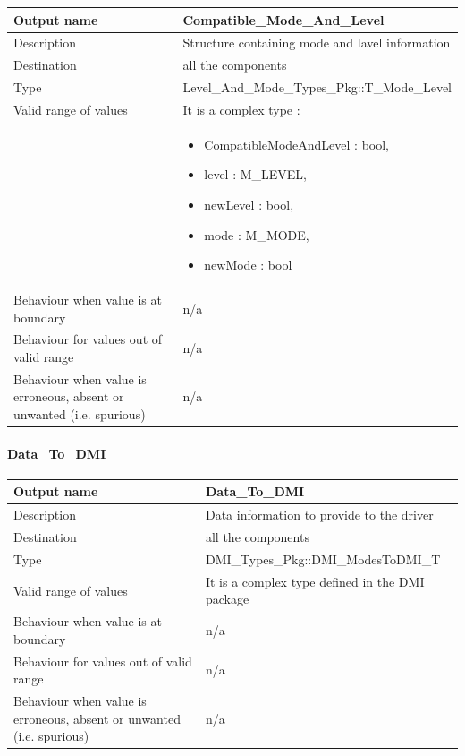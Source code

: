 \begin{longtable}{p{}p{}}
\toprule
Output name				& Compatible\_Mode\_And\_Level \\
\midrule
Description				& Structure containing mode and lavel information  \\
\midrule
Destination				& all the components  \\ 
\midrule
Type					& Level\_And\_Mode\_Types\_Pkg::T\_Mode\_Level \\
\midrule
Valid range of values	& It is a complex type : \\
& \begin{itemize}
\item CompatibleModeAndLevel : bool,
\item level : M\_LEVEL,
\item newLevel : bool,
\item mode : M\_MODE, 
\item newMode : bool
\end{itemize} \\
\midrule
Behaviour when value is at boundary	& n/a \\ 
\midrule
Behaviour for values out of valid range	& n/a \\ 
\midrule
Behaviour when value is erroneous, absent or unwanted (i.e. spurious) & n/a \\
\bottomrule
\end{longtable}

\paragraph{Data\_To\_DMI}

\begin{longtable}{p{}p{}}
\toprule
Output name				& Data\_To\_DMI \\
\midrule
Description				& Data information to provide to the driver  \\
\midrule
Destination				& all the components  \\ 
\midrule
Type					& DMI\_Types\_Pkg::DMI\_ModesToDMI\_T \\
\midrule
Valid range of values	& It is a complex type defined in the DMI package \\
\midrule
Behaviour when value is at boundary	& n/a \\ 
\midrule
Behaviour for values out of valid range	& n/a \\ 
\midrule
Behaviour when value is erroneous, absent or unwanted (i.e. spurious) & n/a \\
\bottomrule
\end{longtable}


